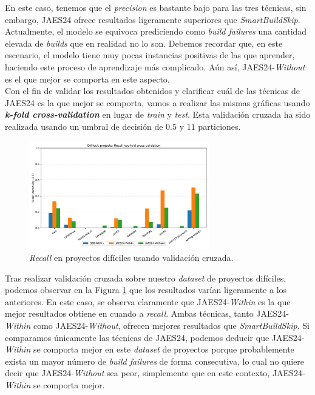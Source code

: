 En este caso, tenemos que el \textit{precision} es bastante bajo para las tres técnicas, sin
embargo, JAES24 ofrece resultados ligeramente superiores que \textit{SmartBuildSkip}.
Actualmente, el modelo se equivoca prediciendo como \textit{build failures} una cantidad elevada
de \textit{builds} que en realidad no lo son. Debemos recordar que, en este escenario, el modelo
tiene muy pocas instancias positivas de las que aprender, haciendo este proceso de aprendizaje
más complicado. Aún así, JAES24-\textit{Without} es el que mejor se comporta en este aspecto.\\

Con el fin de validar los resultados obtenidos y clarificar cuál de las técnicas de JAES24
es la que mejor se comporta, vamos a realizar las mismas gráficas usando \textbf{\textit{k-fold
cross-validation}} en lugar de \textit{train} y \textit{test}. Esta validación cruzada ha sido
realizada usando un umbral de decisión de $0.5$ y $11$ particiones.

\begin{figure}[H]
    \centering
    \includegraphics[width=0.7\textwidth]{images/Difficult projects: Recall key-fold cross validation.pdf}
    \caption{\textit{Recall} en proyectos difíciles usando validación cruzada.}
    \label{fig:key-fold_recall_difficult_projects}
\end{figure}

Tras realizar validación cruzada sobre nuestro \textit{dataset} de proyectos difíciles, podemos
observar en la Figura \ref{fig:key-fold_recall_difficult_projects} que los resultados varían
ligeramente a los anteriores. En este caso, se observa claramente que JAES24-\textit{Within} es
la que mejor resultados obtiene en cuando a \textit{recall}. Ambas técnicas, tanto
JAES24-\textit{Within} como JAES24-\textit{Without}, ofrecen mejores resultados que
\textit{SmartBuildSkip}. Si comparamos únicamente las técnicas de JAES24, podemos deducir
que JAES24-\textit{Within} se comporta mejor en este \textit{dataset} de proyectos porque
probablemente exista un mayor número de \textit{build failures} de forma consecutiva, lo cual no
quiere decir que JAES24-\textit{Without} sea peor, simplemente que en este contexto, JAES24-\textit{Within}
se comporta mejor.\\

